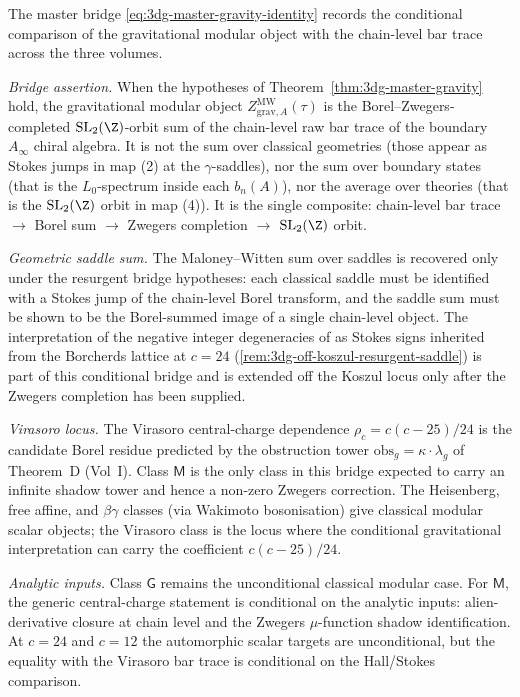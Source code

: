 \begin{remark}%
\label{rem:3dg-master-what-3dqg-is}%
%
%
The master bridge \eqref{eq:3dg-master-gravity-identity} records the
conditional comparison of the gravitational modular object with the
chain-level bar trace across the three volumes.

\emph{Bridge assertion.} When the hypotheses of
Theorem~\ref{thm:3dg-master-gravity} hold, the gravitational modular
object \(Z^{\mathrm{MW}}_{\mathrm{grav}, A}(\tau)\) is the
Borel--Zwegers-completed \(\mathrm{SL}_{2}(\Z)\)-orbit sum of the
chain-level raw bar trace of the boundary \(A_{\infty}\) chiral algebra.
It is not the sum over classical geometries (those appear as Stokes
jumps in map (2) at the $\gamma$-saddles), nor the sum over
boundary states (that is the $L_{0}$-spectrum inside each
$b_{n}(A)$), nor the average over theories (that is the
$\mathrm{SL}_{2}(\Z)$ orbit in map (4)). It is the single composite:
chain-level bar trace $\to$ Borel sum $\to$ Zwegers completion
$\to$ $\mathrm{SL}_{2}(\Z)$ orbit.

\emph{Geometric saddle sum.} The
Maloney--Witten sum over saddles is recovered only under the resurgent
bridge hypotheses: each classical saddle must be identified with a
Stokes jump of the chain-level Borel transform, and the saddle sum
must be shown to be the Borel-summed image of a single chain-level
object. The interpretation of the negative integer degeneracies of
\cite{MaloneyWitten2007} as Stokes signs inherited from the Borcherds
lattice at \(c = 24\)
(\autoref{rem:3dg-off-koszul-resurgent-saddle}) is part of this
conditional bridge and is extended off the Koszul locus only after the
Zwegers completion has been supplied.

\emph{Virasoro locus.} The Virasoro central-charge dependence
\(\rho_{c} = c(c-25)/24\) is the candidate Borel residue predicted by
the obstruction tower \(\mathrm{obs}_{g} = \kappa \cdot \lambda_{g}\)
of Theorem~D \textup{(Vol~I)}. Class \(\mathsf M\) is the only class
in this bridge expected to carry an infinite shadow tower and hence a
non-zero Zwegers correction. The Heisenberg, free affine, and
\(\beta\gamma\) classes (via Wakimoto bosonisation) give classical
modular scalar objects; the Virasoro class is the locus where the
conditional gravitational interpretation can carry the coefficient
\(c(c-25)/24\).

\emph{Analytic inputs.} Class \(\mathsf G\) remains the
unconditional classical modular case. For \(\mathsf M\), the
generic central-charge statement is conditional on the analytic
inputs: alien-derivative closure at chain level and the Zwegers
\(\mu\)-function shadow identification. At \(c=24\) and \(c=12\)
the automorphic scalar targets are unconditional, but the equality
with the Virasoro bar trace is conditional on the Hall/Stokes
comparison.


\end{remark}
